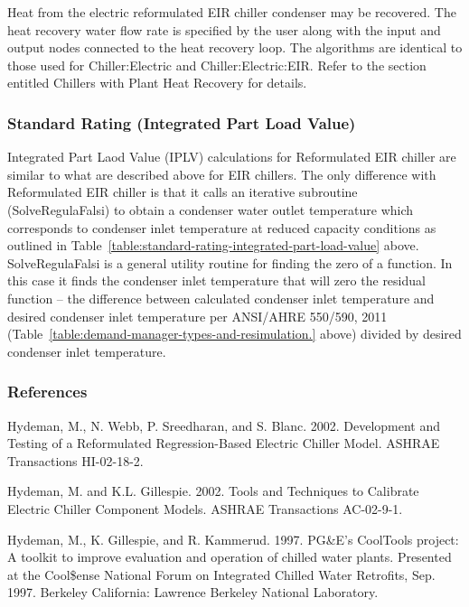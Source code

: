 Heat from the electric reformulated EIR chiller condenser may be recovered. The heat recovery water flow rate is specified by the user along with the input and output nodes connected to the heat recovery loop. The algorithms are identical to those used for Chiller:Electric and Chiller:Electric:EIR. Refer to the section entitled Chillers with Plant Heat Recovery for details.

\subsubsection{Standard Rating (Integrated Part Load Value)}\label{standard-rating-integrated-part-load-value-1}

Integrated Part Laod Value (IPLV) calculations for Reformulated EIR chiller are similar to what are described above for EIR chillers. The only difference with Reformulated EIR chiller is that it calls an iterative subroutine (SolveRegulaFalsi) to obtain a condenser water outlet temperature which corresponds to condenser inlet temperature at reduced capacity conditions as outlined in Table~\ref{table:standard-rating-integrated-part-load-value} above. SolveRegulaFalsi is a general utility routine for finding the zero of a function. In this case it finds the condenser inlet temperature that will zero the residual function -- the difference between calculated condenser inlet temperature and desired condenser inlet temperature per ANSI/AHRE 550/590, 2011 (Table~\ref{table:demand-manager-types-and-resimulation.} above) divided by desired condenser inlet temperature.

\subsubsection{References}\label{references-1-003}

Hydeman, M., N. Webb, P. Sreedharan, and S. Blanc. 2002. Development and Testing of a Reformulated Regression-Based Electric Chiller Model. ASHRAE Transactions HI-02-18-2.

Hydeman, M. and K.L. Gillespie. 2002. Tools and Techniques to Calibrate Electric Chiller Component Models. ASHRAE Transactions AC-02-9-1.

Hydeman, M., K. Gillespie, and R. Kammerud. 1997. PG\&E's CoolTools project: A toolkit to improve evaluation and operation of chilled water plants. Presented at the Cool\$ense National Forum on Integrated Chilled Water Retrofits, Sep. 1997. Berkeley California: Lawrence Berkeley National Laboratory.

